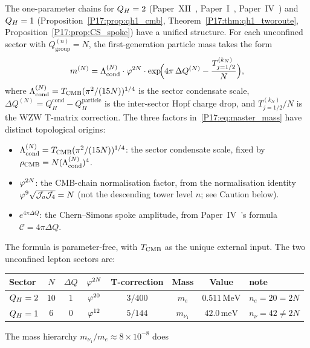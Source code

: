 \begin{remark}
\label{P17:rem:master_formula}
The one-parameter chains for $Q_H=2$ (Paper~XII~\cite{Paper12}, Paper~I~\cite{Paper1}, Paper~IV~\cite{Paper4})
and $Q_H=1$ (Proposition~\ref{P17:prop:qh1_cmb},
Theorem~\ref{P17:thm:qh1_tworoute}, Proposition~\ref{P17:prop:CS_spoke})
have a unified structure.  For each unconfined sector with
$Q_{\mathrm{group}}^{(n)}=N$, the first-generation particle mass takes the form
\begin{equation}
  m^{(N)}
  = \Lambda_{\mathrm{cond}}^{(N)}\cdot\varphi^{2N}
    \cdot\exp\!\Bigl(4\pi\,\Delta Q^{(N)}-\frac{T_{j=1/2}^{(k_N)}}{N}\Bigr),
  \label{P17:eq:master_mass}
\end{equation}
where $\Lambda_{\mathrm{cond}}^{(N)}=T_{\mathrm{CMB}}(\pi^2/(15N))^{1/4}$ is the sector condensate scale,
$\Delta Q^{(N)}=Q_H^{\mathrm{cond}}-Q_H^{\mathrm{particle}}$ is the inter-sector
Hopf charge drop, and $T_{j=1/2}^{(k_N)}/N$ is the WZW T-matrix correction.
The three factors in~\eqref{P17:eq:master_mass} have distinct topological origins:
\begin{itemize}[noitemsep]
\item $\Lambda_{\mathrm{cond}}^{(N)}=T_{\mathrm{CMB}}(\pi^2/(15N))^{1/4}$:
  the sector condensate scale, fixed by $\rho_{\mathrm{CMB}}=N(\Lambda_{\mathrm{cond}}^{(N)})^4$.
\item $\varphi^{2N}$: the CMB-chain normalisation factor, from the
  normalisation identity $\varphi^9\sqrt{\mathcal{J}_a\mathcal{J}_4}=N$
  (not the descending tower level $n$; see Caution below).
\item $e^{4\pi\Delta Q}$: the Chern--Simons spoke amplitude,
  from Paper~IV~\cite{Paper4}'s formula $\mathcal{C}=4\pi\Delta Q$.
\end{itemize}
The formula is parameter-free, with $T_{\mathrm{CMB}}$ as the unique external
input.  The two unconfined lepton sectors are:
\begin{center}
\renewcommand{\arraystretch}{1.3}
\begin{tabular}{lccccccl}
\toprule
Sector & $N$ & $\Delta Q$ & $\varphi^{2N}$ & T-correction & Mass & Value & note \\
\midrule
$Q_H=2$ & $10$ & $1$ & $\varphi^{20}$ & $3/400$ & $m_e$ & $0.511\,\mathrm{MeV}$ & $n_e=20=2N$ \\
$Q_H=1$ & $6$  & $0$ & $\varphi^{12}$ & $5/144$ & $m_{\nu_1}$ & $42.0\,\mathrm{meV}$ & $n_\nu=42\neq2N$ \\
\bottomrule
\end{tabular}
\end{center}
The mass hierarchy $m_{\nu_1}/m_e\approx8\times10^{-8}$ does

\end{remark}
